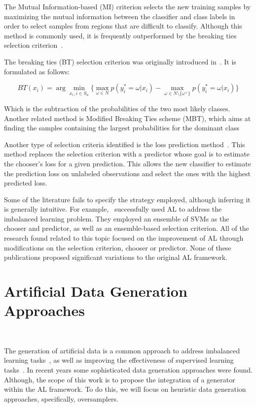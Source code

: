 \documentclass[parskip=full]{scrartcl}
\begin{document}
The Mutual Information-based (MI) criterion selects the new training samples by
maximizing the mutual information between the classifier and class labels in
order to select samples from regions that are difficult to classify. Although
this method is commonly used, it is frequently outperformed by the breaking
ties selection criterion~\cite{Li2011,Liu2018}.

The breaking ties (BT) selection criterion was originally introduced
in~\cite{Luo2003}. It is formulated as follows:

\begin{equation}\label{eq:breaking_ties}
    BT(x_i) = \arg \min_{x_i, i \in S_u}\{ \max_{\omega \in N}{p(y_{i}^{*}=\omega|x_i)} -
    \max_{\omega \in N\setminus\{\omega^{+}\}}{p(y_{i}^{*}=\omega|x_i)}\}
\end{equation}

Which is the subtraction of the probabilities of the two most likely classes.
Another related method is Modified Breaking Ties scheme (MBT), which aims at
finding the samples containing the largest probabilities for the dominant
class~\cite{Liu2018,Li2013a}

Another type of selection criteria identified is the loss prediction
method~\cite{Yoo2019}. This method replaces the selection criterion with a
predictor whose goal is to estimate the chooser's loss for a given
prediction. This allows the new classifier to estimate the prediction loss on
unlabeled observations and select the ones with the highest predicted loss.

Some of the literature fails to specify the strategy employed, although
inferring it is generally intuitive. For example,~\cite{Ertekin2007}
successfully used AL to address the imbalanced learning problem. They employed
an ensemble of SVMs as the chooser and predictor, as well as an ensemble-based
selection criterion. All of the research found related to this topic focused on
the improvement of AL through modifications on the selection criterion, chooser
or predictor. None of these publications proposed significant variations to the
original AL framework.

\section{Artificial Data Generation Approaches}~\label{sec:ovs-sota}

The generation of artificial data is a common approach to address imbalanced
learning tasks~\cite{Kaur2019}, as well as improving the effectiveness of
supervised learning tasks~\cite{DeVries2017}. In recent years some
sophisticated data generation approaches were found. Although, the scope of
this work is to propose the integration of a generator within the AL
framework. To do this, we will focus on heuristic data generation approaches,
specifically, oversamplers.
\end{document}
